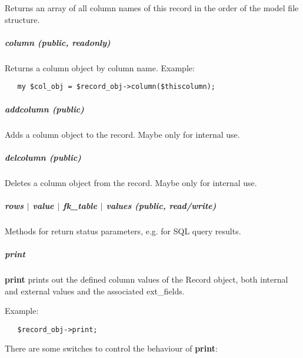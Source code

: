 Returns an array of all column names of this record in the order of the
model file structure.

\subparagraph*{column (public, readonly)\label{Apiis::DataBase::Record_--_package_for_DataBase_Record_objects_column_public_readonly_}}


Returns a column object by column name. Example:

\begin{verbatim}
   my $col_obj = $record_obj->column($thiscolumn);
\end{verbatim}
\subparagraph*{addcolumn (public)\label{Apiis::DataBase::Record_--_package_for_DataBase_Record_objects_addcolumn_public_}}


Adds a column object to the record. Maybe only for internal use.

\subparagraph*{delcolumn (public)\label{Apiis::DataBase::Record_--_package_for_DataBase_Record_objects_delcolumn_public_}}


Deletes a column object from the record. Maybe only for internal use.

\subparagraph*{rows $|$ value $|$ fk\_table $|$ values (public, read/write)\label{Apiis::DataBase::Record_--_package_for_DataBase_Record_objects_rows_value_fk_table_values_public_read_write_}}


Methods for return status parameters, e.g. for SQL query results.

\subparagraph*{print\label{Apiis::DataBase::Record_--_package_for_DataBase_Record_objects_print}}


\textbf{print} prints out the defined column values of the Record object, both
internal and external values and the associated ext\_fields.



Example:

\begin{verbatim}
   $record_obj->print;
\end{verbatim}


There are some switches to control the behaviour of \textbf{print}:

